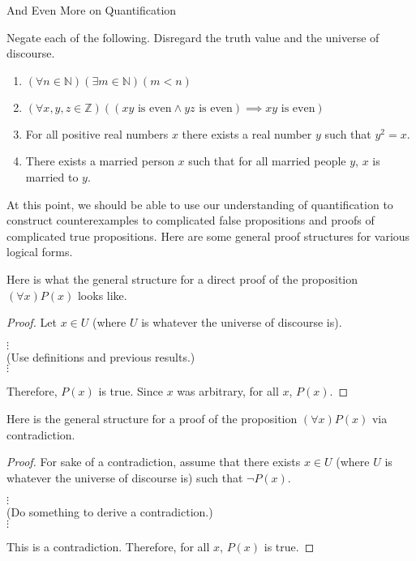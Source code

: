 \begin{section}{And Even More on Quantification}
\begin{exercise}
Negate each of the following.  Disregard the truth value and the universe of discourse.
\begin{enumerate}
\item $(\forall n\in\mathbb{N})(\exists m\in\mathbb{N})(m<n)$
\item $(\forall x,y,z\in\mathbb{Z})((xy \mbox{ is even}\wedge yz\mbox{ is even})\implies xy\mbox{ is even})$
\item For all positive real numbers $x$ there exists a real number $y$ such that $y^2=x$.
\item There exists a married person $x$ such that for all married people $y$, $x$ is married to $y$.
\end{enumerate}
\end{exercise}

At this point, we should be able to use our understanding of quantification to construct counterexamples to complicated false propositions and proofs of complicated true propositions.  Here are some general proof structures for various logical forms.

\begin{skeleton}
Here is what the general structure for a direct proof of the proposition $(\forall x)P(x)$ looks like.

\bigskip

\begin{textbox}
\begin{proof}
Let $x \in U$ (where $U$ is whatever the universe of discourse is).
\begin{center}
$\vdots$\\
(Use definitions and previous results.)\\
$\vdots$
\end{center}
\noindent Therefore, $P(x)$ is true.  Since $x$ was arbitrary, for all $x$, $P(x)$.
\end{proof}
\end{textbox}

\end{skeleton}

\begin{skeleton}
Here is the general structure for a proof of the proposition $(\forall x)P(x)$ via contradiction.

\bigskip

\begin{textbox}
\begin{proof}
For sake of a contradiction, assume that there exists $x\in U$ (where $U$ is whatever the universe of discourse is) such that $\neg P(x)$.
\begin{center}
$\vdots$\\
(Do something to derive a contradiction.)\\
$\vdots$
\end{center}
\noindent This is a contradiction.  Therefore, for all $x$, $P(x)$ is true.
\end{proof}
\end{textbox}
\end{skeleton}



\end{section}
